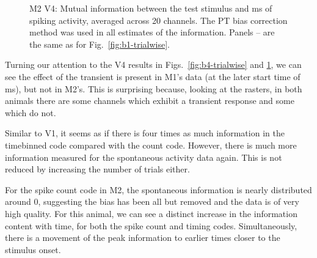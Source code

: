 \begin{figure}[htbp]
\begin{subfigure}[b]{0.5\linewidth}
    \end{subfigure}
    \caption{\small{}M2 V4: Mutual information between the test stimulus and \unit[20]{ms} of spiking activity, averaged across 20 channels.
The PT bias correction method was used in all estimates of the information.
Panels -- are the same as for Fig.~\ref{fig:b1-trialwise}.
}
    \label{fig:j4-trialwise}
\end{figure}



Turning our attention to the V4 results in Figs.~\ref{fig:b4-trialwise} and \ref{fig:j4-trialwise}, we can see the effect of the transient is present in M1's data (at the later start time of \unit[75]{ms}), but not in M2's. This is surprising because, looking at the rasters, in both animals there are some channels which exhibit a transient response and some which do not.

Similar to V1, it seems as if there is four times as much information in the timebinned code compared with the count code. However, there is much more information measured for the spontaneous activity data again. This is not reduced by increasing the number of trials either.

For the spike count code in M2, the spontaneous information is nearly distributed around 0, suggesting the bias has been all but removed and the data is of very high quality. For this animal, we can see a distinct increase in the information content with time, for both the spike count and timing codes. Simultaneously, there is a movement of the peak information to earlier times closer to the stimulus onset.

